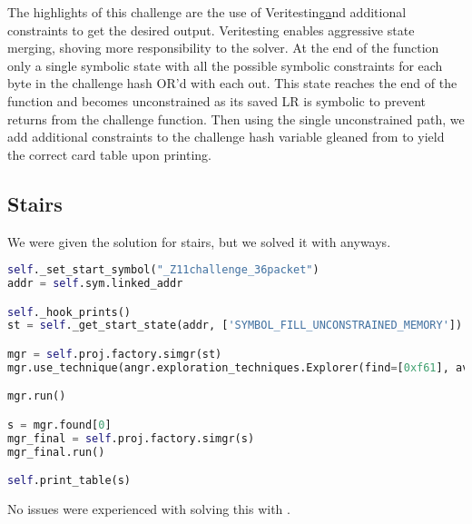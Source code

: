 The highlights of this challenge are the use of Veritesting\href{https://github.com/angr/angr/blob/master/angr/analyses/veritesting.py} and additional constraints to get the desired output. Veritesting enables aggressive state merging, shoving more responsibility to the solver. At the end of the function only a single symbolic state with all the possible symbolic constraints for each byte in the challenge hash OR'd with each out. This state reaches the end of the function and becomes unconstrained as its saved LR is symbolic to prevent returns from the challenge function. Then using the single unconstrained path, we add additional constraints to the challenge hash variable gleaned from \ghidra to yield the correct card table upon printing.

\subsection{Stairs}
We were given the solution for stairs, but we solved it with \angr anyways.

\begin{lstlisting}[language=python]
self._set_start_symbol("_Z11challenge_36packet")
addr = self.sym.linked_addr

self._hook_prints()
st = self._get_start_state(addr, ['SYMBOL_FILL_UNCONSTRAINED_MEMORY'])

mgr = self.proj.factory.simgr(st)
mgr.use_technique(angr.exploration_techniques.Explorer(find=[0xf61], avoid=[0xf85,0xf39]))

mgr.run()

s = mgr.found[0]
mgr_final = self.proj.factory.simgr(s)
mgr_final.run()

self.print_table(s)
\end{lstlisting}

\noindent No issues were experienced with solving this with \angr.
